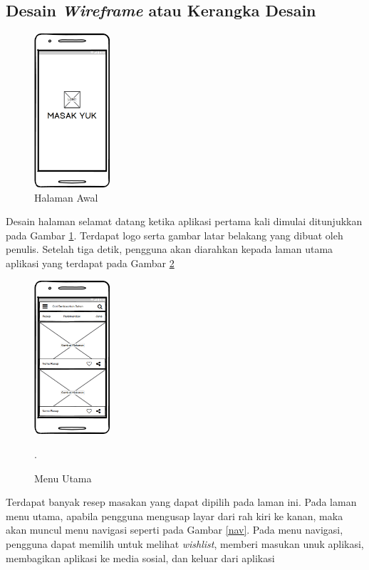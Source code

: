 	\subsection{Desain \textit{Wireframe} atau Kerangka Desain}
		\begin{figure}[H]
			\centering
			\includegraphics[width=0.25\textwidth]{gambar/wireframe/Splash}
			\caption{Halaman Awal}
			\label{splash}
		\end{figure}
		Desain halaman selamat datang ketika aplikasi pertama kali dimulai ditunjukkan pada Gambar \ref{splash}. Terdapat logo serta gambar latar belakang yang dibuat oleh penulis. Setelah tiga detik, pengguna akan diarahkan kepada laman utama aplikasi yang terdapat pada Gambar \ref{menu_utama} 
		\begin{figure}[H]
			\centering
			\includegraphics[width=0.25\textwidth]{gambar/wireframe/MenuUtama}
			\caption{Menu Utama}.
			\label{menu_utama} 
		\end{figure}
		Terdapat banyak resep masakan yang dapat dipilih pada laman ini. Pada laman menu utama, apabila pengguna mengusap layar dari rah kiri ke kanan, maka akan muncul menu navigasi seperti pada Gambar \ref{nav}. Pada menu navigasi, pengguna dapat memilih untuk melihat \textit{wishlist}, memberi masukan unuk aplikasi, membagikan aplikasi ke media sosial, dan keluar dari aplikasi
